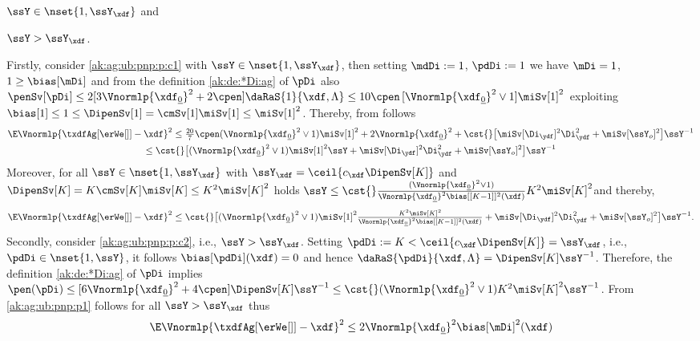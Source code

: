 \begin{pro}
\begin{inparaenum}[i]
$\ssY\in\nset{1,\ssY_{\xdf}}$ and \item\label{ak:ag:ub:pnp:p:c2}
$\ssY> \ssY_{\xdf}$. \end{inparaenum} Firstly, consider
\ref{ak:ag:ub:pnp:p:c1} with $\ssY\in\nset{1,\ssY_{\xdf}}$, then setting $\mdDi:=1$, $\pdDi:=1$ we have
$\mDi=1$, $1\geq\bias[\mDi]$ and from the definition
\eqref{ak:de:*Di:ag} of  $\pDi$ also
$\penSv[\pDi]\leq2[3\Vnormlp{\xdf_{\underline{0}}}^2+2\cpen]\daRaS{1}{\xdf,\Lambda}\leq10\cpen\,[\Vnormlp{\xdf_{\underline{0}}}^2\vee1]\miSv[1]^2$
exploiting $\bias[1]\leq1\leq\DipenSv[1]=\cmSv[1]
\miSv[1]\leq\miSv[1]^2$. Thereby,  from  
follows
 \begin{multline*}
     \E\Vnormlp{\txdfAg[{\erWe[]}]-\xdf}^2\leq \tfrac{20}{7}\cpen(\Vnormlp{\xdf_{\underline{0}}}^2\vee1)\miSv[1]^2   +2\Vnormlp{\xdf_{\underline{0}}}^2
    +\cst{}\big[\miSv[\Di_{\ydf}]^2\Di_{\ydf}^2+\miSv[\ssY_{o}]^2
    \big]\ssY^{-1}\\
    \leq \cst{}\big[(\Vnormlp{\xdf_{\underline{0}}}^2\vee1)\miSv[1]^2\ssY+\miSv[\Di_{\ydf}]^2\Di_{\ydf}^2+\miSv[\ssY_{o}]^2\big]\ssY^{-1}
\end{multline*}
Moreover, for all $\ssY\in\nset{1,\ssY_{\xdf}}$ with
$\ssY_{\xdf}=\ceil{c_{\xdf}\DipenSv[K]}$ and
$\DipenSv[K]=K\cmSv[K] \miSv[K]\leq K^2\miSv[K]^2$ holds
$\ssY\leq\cst{}\tfrac{(\Vnormlp{\xdf_{\underline{0}}}^2\vee1)}{\Vnormlp{\xdf_{\underline{0}}}^2\bias[{[K-1]}]^2(\xdf)}
K^2\miSv[K]^2$and thereby, 
\begin{equation}\label{ak:ag:ub:pnp:p4}
  \E\Vnormlp{\txdfAg[{\erWe[]}]-\xdf}^2\leq
  \cst{}\big[(\Vnormlp{\xdf_{\underline{0}}}^2\vee1)\miSv[1]^2\tfrac{K^2\miSv[K]^2}{\Vnormlp{\xdf_{\underline{0}}}^2\bias[{[K-1]}]^2(\xdf)}+\miSv[\Di_{\ydf}]^2\Di_{\ydf}^2+\miSv[\ssY_{o}]^2\big]\ssY^{-1}.
\end{equation}
Secondly, consider \ref{ak:ag:ub:pnp:p:c2}, i.e., $\ssY>
\ssY_{\xdf}$. Setting
$\pdDi:=K< \ceil{c_{\xdf}\DipenSv[K]}=\ssY_{\xdf}$, i.e.,
$\pdDi\in\nset{1,\ssY}$, it follows $\bias[\pdDi](\xdf)=0$ and hence
$\daRaS{\pdDi}{\xdf,\Lambda}= \DipenSv[K] \ssY^{-1}$.  Therefore, the
definition \eqref{ak:de:*Di:ag} of $\pDi$ implies
$\pen(\pDi)\leq[6\Vnormlp{\xdf_{\underline{0}}}^2+ 4\cpen]\DipenSv[K]
\ssY^{-1}\leq
\cst{}(\Vnormlp{\xdf_{\underline{0}}}^2\vee1)K^2\miSv[K]^2\ssY^{-1}$. From
\eqref{ak:ag:ub:pnp:p1} follows for all $\ssY> \ssY_{\xdf}$ thus
\begin{multline}\label{ak:ag:ub:pnp:p5}
  \E\Vnormlp{\txdfAg[{\erWe[]}]-\xdf}^2\leq 2\Vnormlp{\xdf_{\underline{0}}}^2\bias[\mDi]^2(\xdf)

\end{multline}
\end{pro}
